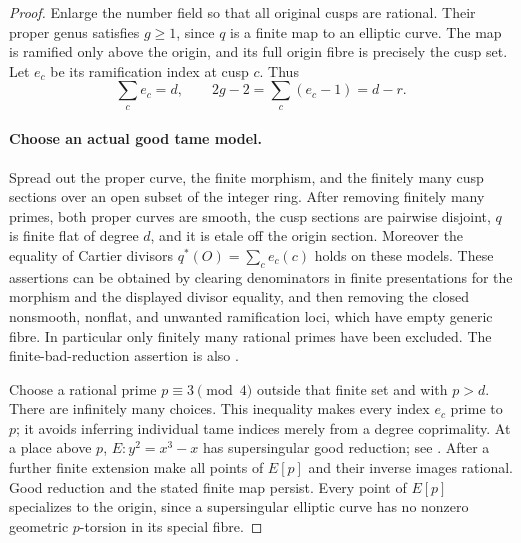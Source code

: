 \begin{proof}
Enlarge the number field so that all original cusps are rational.
Their proper genus satisfies \(g\ge1\), since \(q\) is a finite
map to an elliptic curve. The map is ramified only above the origin,
and its full origin fibre is precisely the cusp set. Let \(e_c\)
be its ramification index at cusp \(c\). Thus
\[
                   \sum_c e_c=d,\qquad
                         2g-2=\sum_c(e_c-1)=d-r.    \tag{A.53.2}
\]

\paragraph{Choose an actual good tame model.}
Spread out the proper curve, the finite morphism, and the finitely
many cusp sections over an open subset of the integer ring. After
removing finitely many primes, both proper curves are smooth, the
cusp sections are pairwise disjoint, \(q\) is finite flat of degree
\(d\), and it is etale off the origin section. Moreover the equality
of Cartier divisors
\(q^*(O)=\sum_c e_c(c)\) holds on these models.
These assertions can be obtained by clearing denominators in finite
presentations for the morphism and the displayed divisor equality,
and then removing the closed nonsmooth, nonflat, and unwanted
ramification loci, which have empty generic fibre. In particular
only finitely many rational primes have been excluded. The
finite-bad-reduction assertion is also
\cite[Proposition 10.1.21(a), pp.~462--463]{fghLiu}.

Choose a rational prime \(p\equiv3\pmod4\) outside that finite set
and with \(p>d\). There are infinitely many choices. This inequality
makes every index \(e_c\) prime to \(p\); it avoids inferring
individual tame indices merely from a degree coprimality. At a place
above \(p\), \(E:y^2=x^3-x\) has supersingular good reduction;
see \cite[Theorem V.4.1(a) and Example V.4.5, pp.~148 and 152]{fghSilvermanAEC}.
After a further finite extension make all points of \(E[p]\) and
their inverse images rational. Good reduction and the stated finite
map persist. Every point of \(E[p]\) specializes to the origin,
since a supersingular elliptic curve has no nonzero geometric
\(p\)-torsion in its special fibre.


\end{proof}
